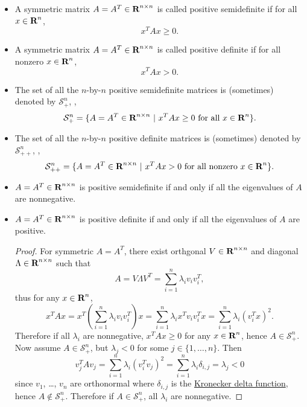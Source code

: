 \documentclass[11pt, oneside]{article}   	%
\newcommand{\possemidefset}[1]{\mathcal{S}_+^{#1}}
\newcommand{\posdefset}[1]{\mathcal{S}_{++}^{#1}}
\begin{document}
\begin{itemize}

\item
A symmetric matrix $A=A^T\in{\mbox{\bf R}}^{n\times n}$ is called positive semidefinite if for all $x\in{\mbox{\bf R}}^n$,
\begin{equation}
x^T A x \geq 0.
\end{equation}

\item
A symmetric matrix $A=A^T\in{\mbox{\bf R}}^{n\times n}$ is called positive definite if for all nonzero $x\in{\mbox{\bf R}}^n$,
\begin{equation}
x^T A x > 0.
\end{equation}

\item The set of all the $n$-by-$n$ positive semidefinite matrices is (sometimes) denoted by $\possemidefset{n}$,
\ie,
\begin{equation}
\possemidefset{n} = \set{A=A^T\in\reals^{n\times n}}{x^T A x \geq 0 \mbox{ for all } x \in \reals^n}.
\end{equation}

\item The set of all the $n$-by-$n$ positive definite matrices is (sometimes) denoted by $\posdefset{n}$,
\ie,
\begin{equation}
\posdefset{n} = \set{A=A^T\in\reals^{n\times n}}{x^T A x > 0 \mbox{ for all nonzero } x \in \reals^n}.
\end{equation}

\item $A=A^T\in{\mbox{\bf R}}^{n\times n}$ is positive semidefinite if and only if all the eigenvalues of $A$ are nonnegative.

\item $A=A^T\in{\mbox{\bf R}}^{n\times n}$ is positive definite if and only if all the eigenvalues of $A$ are positive.

\begin{proof}
For symmetric $A=A^T$, there exist orthgonal $V\in{\mbox{\bf R}}^{n\times n}$ and diagonal $\Lambda\in{\mbox{\bf R}}^{n\times n}$
such that
\[
A = V \Lambda V^T = \sum_{i=1}^n \lambda_i v_i v_i^T,
\]
thus for any $x\in{\mbox{\bf R}}^n$,
\[
x^T A x = x^T \left(\sum_{i=1}^n \lambda_i v_i v_i^T \right) x
= \sum_{i=1}^n \lambda_i x^T v_i v_i^T x
= \sum_{i=1}^n \lambda_i (v_i^T x)^2.
\]
Therefore if all $\lambda_i$ are nonnegative, $x^T A x\geq0$ for any $x\in{\mbox{\bf R}}^n$, hence $A\in\possemidefset{n}$.
Now assume $A\in\possemidefset{n}$, but $\lambda_j < 0$ for some $j\in\{1,\ldots,n\}$.
Then
\begin{equation}
v_j^T A v_j
= \sum_{i=1}^n \lambda_i (v_i^T v_j)^2
= \sum_{i=1}^n \lambda_i \delta_{i,j}
= \lambda_j < 0
\end{equation}
since $v_1$, \ldots, $v_n$ are orthonormal
where
$\delta_{i,j}$ is the \href{https://en.wikipedia.org/wiki/Kronecker_delta}{Kronecker delta function},
hence $A\not \in \possemidefset{n}$.
Therefore if $A\in\possemidefset{n}$, all $\lambda_i$ are nonnegative.


\end{proof}
\end{itemize}
\end{document}
